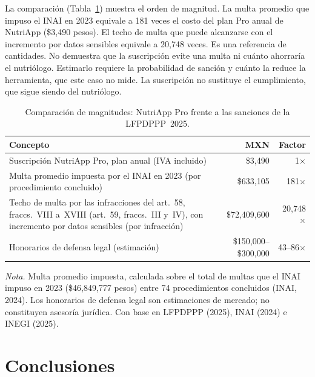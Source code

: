 \documentclass[12pt, a4paper]{article}
\makeatletter
\newcommand{\saltoseccion}{\par
  \ifx\@deferlist\@empty
    \ifdim\pagegoal<\maxdimen
      \ifdim\dimexpr\textheight-\pagegoal+\pagetotal\relax>0.5\textheight\clearpage\fi
    \fi
  \else\clearpage\fi}
\let\seccionbase\section
\renewcommand{\section}{\saltoseccion\seccionbase}
\makeatother
\begin{document}
La comparación (Tabla~\ref{tab:costo-beneficio}) muestra el orden de
magnitud. La multa promedio que impuso el INAI en 2023 equivale a 181
veces el costo del plan Pro anual de NutriApp (\$3,490 pesos). El techo
de multa que puede alcanzarse con el incremento por datos sensibles
equivale a 20,748 veces. Es una referencia de cantidades. No demuestra que la suscripción evite una multa ni cuánto ahorraría el nutriólogo. Estimarlo requiere la probabilidad de sanción y cuánto la reduce la herramienta, que este caso no mide. La suscripción no
sustituye el cumplimiento, que sigue siendo del nutriólogo.
 
\begin{table}[H]
  \centering
  \caption{Comparación de magnitudes: NutriApp Pro frente a las sanciones de la LFPDPPP~2025.}
  \label{tab:costo-beneficio}
  \begin{tabularx}{\textwidth}{X r r}
    \toprule
    \textbf{Concepto} & \textbf{MXN} & \textbf{Factor} \\
    \midrule
    Suscripción NutriApp Pro, plan anual (IVA incluido) & \$3,490 & 1$\times$ \\
    Multa promedio impuesta por el INAI en 2023 (por procedimiento concluido) & \$633,105 & 181$\times$ \\
    Techo de multa por las infracciones del art.~58, fraccs.~VIII a~XVIII (art.~59, fraccs.~III y~IV), con incremento por datos sensibles (por infracción) & \$72,409,600 & 20,748$\times$ \\
    Honorarios de defensa legal (estimación) & \$150,000--\$300,000 & 43--86$\times$ \\
    \bottomrule
  \end{tabularx}
  \begin{flushleft}
    \small\textit{Nota.} Multa promedio impuesta, calculada sobre el total
    de multas que el INAI impuso en 2023 (\$46,849,777 pesos) entre 74
    procedimientos concluidos (INAI, 2024). Los honorarios de defensa legal
    son estimaciones de mercado; no constituyen asesoría jurídica. Con base en LFPDPPP (2025), INAI (2024) e INEGI (2025).
  \end{flushleft}
\end{table}

\section{Conclusiones}
\end{document}
